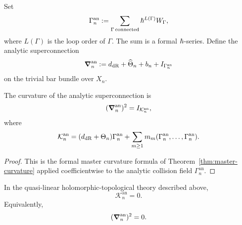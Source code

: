 Set
\[
 \Gamma_n^{\mathrm{an}} := \sum_{\Gamma\,\mathrm{connected}} \hbar^{L(\Gamma)}W_\Gamma,
\]
where $L(\Gamma)$ is the loop order of $\Gamma$. The sum is a formal $\hbar$-series. Define the analytic superconnection
\[
 \boldsymbol{\nabla}_n^{\mathrm{an}} := d_{\mathrm{dR}}+\widehat\Theta_n+b_n+I_{\Gamma_n^{\mathrm{an}}}
\]
on the trivial bar bundle over $X_n$.

\begin{theorem}\label{thm:analytic-curvature}
The curvature of the analytic superconnection is
\[
 (\boldsymbol{\nabla}_n^{\mathrm{an}})^2 = I_{\mathcal K_n^{\mathrm{an}}},
\]
where
\[
 \mathcal K_n^{\mathrm{an}}
 =
 (d_{\mathrm{dR}}+\Theta_n)\Gamma_n^{\mathrm{an}}
 +
 \sum_{m\ge 1}m_m(\Gamma_n^{\mathrm{an}},\dots,\Gamma_n^{\mathrm{an}}).
\]
\end{theorem}

\begin{proof}
This is the formal master curvature formula of Theorem~\ref{thm:master-curvature} applied coefficientwise to the analytic collision field $\Gamma_n^{\mathrm{an}}$.
\end{proof}

\begin{theorem}\label{thm:analytic-flatness}
In the quasi-linear holomorphic-topological theory described above,
\[
 \mathcal K_n^{\mathrm{an}}=0.
\]
Equivalently,
\[
 (\boldsymbol{\nabla}_n^{\mathrm{an}})^2=0.
\]
\end{theorem}

